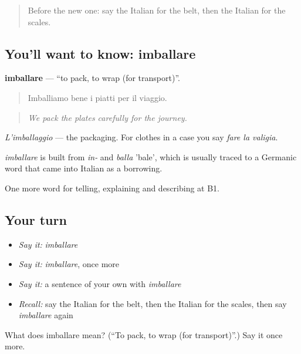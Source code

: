 \label{lesson:IT-C426-imballare}



\begin{quote}
Before the new one: say the Italian for the belt, then the Italian for the scales.
\end{quote}

\subsection*{You'll want to know: imballare}
\textbf{imballare} — \textquotedblleft{}to pack, to wrap (for transport)\textquotedblright{}.

\begin{quote}
Imballiamo bene i piatti per il viaggio.
\end{quote}

\begin{quote}
\emph{We pack the plates carefully for the journey.}
\end{quote}

\emph{L'imballaggio} — the packaging. For clothes in a case you say \emph{fare la valigia}.

\begin{cousinweb}
\emph{imballare} is built from \emph{in-} and \emph{balla} 'bale', which is usually traced to a Germanic word that came into Italian as a borrowing.
\end{cousinweb}

\begin{grammarlens}[title={What you've built}]
One more word for telling, explaining and describing at B1.
\end{grammarlens}

\subsection*{Your turn}
\begin{itemize}
\raggedright
  \item \emph{Say it:} \emph{imballare}
  \item \emph{Say it:} \emph{imballare}, once more
  \item \emph{Say it:} a sentence of your own with \emph{imballare}
  \item \emph{Recall:} say the Italian for the belt, then the Italian for the scales, then say \emph{imballare} again
\end{itemize}

\begin{tcolorbox}[breakable,colback=teal!4,colframe=teal!35!black,title={Before you move on}]
What does imballare mean? (\textquotedblleft{}To pack, to wrap (for transport)\textquotedblright{}.) Say it once more.
\end{tcolorbox}
